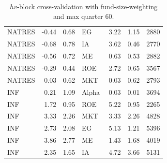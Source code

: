 \documentclass[12pt]{article}
\begin{document}
\begin{table}[ht]
\begin{tabular}{lrrlrrl}
		NATRES & -0.44 & 0.68 & EG & 3.22 & 1.15 & 2880 \\ 
		NATRES & -0.68 & 0.78 & IA & 3.62 & 0.46 & 2770 \\ 
		NATRES & -0.56 & 0.72 & ME & 0.63 & 0.53 & 2882 \\ 
		NATRES & -0.29 & 0.44 & ROE & 2.72 & 0.65 & 3567 \\ 
		NATRES & -0.03 & 0.62 & MKT & -0.03 & 0.62 & 2793 \\ 
		INF & 0.21 & 1.09 & Alpha & 0.03 & 0.01 & 3694 \\ 
		INF & 1.72 & 0.95 & ROE & 5.22 & 0.95 & 2265 \\ 
		INF & 3.33 & 2.26 & MKT & 3.33 & 2.26 & 4828 \\ 
		INF & 2.73 & 2.08 & EG & 5.13 & 1.21 & 5396 \\ 
		INF & 3.86 & 2.77 & ME & -1.43 & 1.68 & 4019 \\ 
		INF & 2.35 & 1.65 & IA & 4.72 & 3.66 & 5131 \\ 
		\hline
	\end{tabular}
	\caption{$hv$-block cross-validation with fund-size-weighting and max quarter 60.} 
	\label{tab:cv_60_fw}
\end{table}
\end{document}
